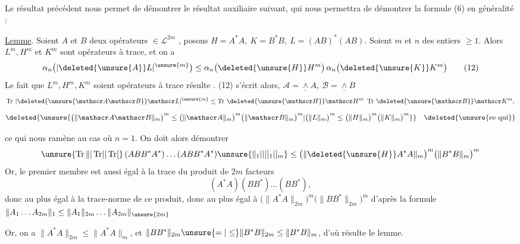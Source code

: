 Le résultat précédent nous permet de démontrer le résultat auxiliaire suivant, qui nous permettra de démontrer la formule (6) en  généralité :

\uline{Lemme}. Soient $A$ et $B$ deux opérateurs $\in\mathcal L^{2m}$ , posons
$H=A^*A,\ K=B^*B,\ L=(AB)^*(AB)$.
  Soient $m$ et $n$ des entiers $\geq1$.
Alors  $L^m,H^m$ et $K^m$ sont opérateurs à trace, et on a
\[
\alpha_n\bigl(|\deleted{\unsure{A}}L|^{\unsure{m}}\bigr)
\leq\alpha_n\bigl(\deleted{\unsure{H}}H^m\bigr)\,\alpha_n\bigl(\deleted{\unsure{K}}K^m\bigr)
\tag*{(12)}
\]
Le fait que $L^m,H^m,K^m$ soient opérateurs à trace résulte  . (12) s'écrit alors, 
 $\mathscr A=\underline{\wedge} A,\ \mathscr B=\underline{\wedge} B$
\[
\operatorname{Tr}\,|\deleted{\unsure{\mathscr A\mathscr B}}\mathscr L|^{\unsure{m}}\leq
\operatorname{Tr}\,\deleted{\unsure{\mathscr H}}\mathscr H^m\ \operatorname{Tr}\,\deleted{\unsure{\mathscr B}}\mathscr K^m,
\]
\[
\deleted{\unsure{\bigl(\|\mathscr A\mathscr B\|_m\bigr)^m\leq
\bigl(\|\mathscr A\|_m\bigr)^m\bigl(\|\mathscr B\|_m\bigr)^m|\bigl(\|L\|_m\bigr)^m\leq\bigl(\|H\|_m\bigr)^m\bigl(\|K\|_m\bigr)^m}}\quad
\deleted{\text{\unsure{ce qui}}}
\]

ce qui nous ramène au cas où $n=1$. On doit alors démontrer
\[
\unsure{\operatorname{Tr}\||\operatorname{Tr}\lvert|\operatorname{Tr}[}\,(ABB^*A^*)\ldots(ABB^*A^*)\unsure{\|_1|\rvert|]_1|]_m}
\leq\bigl(\|\deleted{\unsure{H}}A^*A\|_m\bigr)^m\bigl(\|B^*B\|_m\bigr)^m
\]
Or, le premier membre  est aussi égal à la
 trace du produit de $2m$ facteurs
\[
(A^*A)(BB^*)\ldots(BB^*),
\]
donc au plus égal à la trace-norme de ce produit, donc au plus égal à
$\bigl(\|A^*A\|_{2m}\bigr)^m\bigl(\|BB^*\|_{2m}\bigr)^m$
d'après la formule $\|A_1\ldots A_{2m}\|_1\leq\|A_1\|_{2m}\ldots\|A_{2m}\|_{\unsure{2m}}$

Or, on a $\|A^*A\|_{2m}\leq\|A^*A\|_m$, et
$\|BB^*\|_{2m}\unsure{=|\leq}\|B^*B\|_{2m}\leq\|B^*B\|_m$, d'où résulte le lemme.
